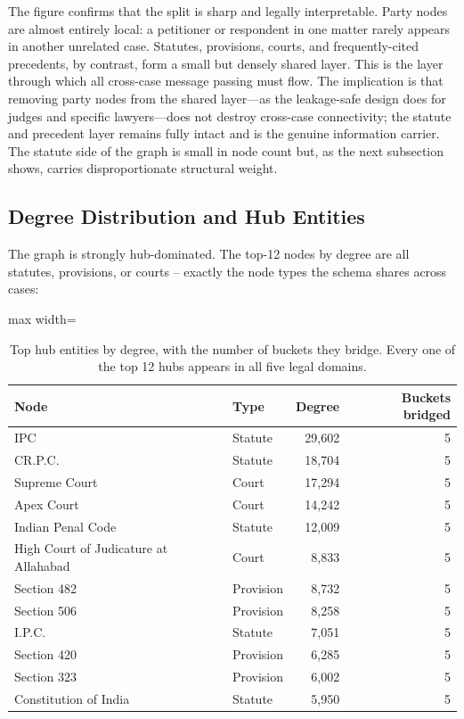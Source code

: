 The figure confirms that the split is sharp and legally interpretable. Party nodes
are almost entirely local: a petitioner or respondent in one matter rarely appears
in another unrelated case. Statutes, provisions, courts, and frequently-cited
precedents, by contrast, form a small but densely shared layer. This is the layer
through which all cross-case message passing must flow. The implication is that
removing party nodes from the shared layer---as the leakage-safe design does for
judges and specific lawyers---does not destroy cross-case connectivity; the
statute and precedent layer remains fully intact and is the genuine information
carrier. The statute side of the graph is small in node count but, as the next
subsection shows, carries disproportionate structural weight.

\subsection{Degree Distribution and Hub Entities}

The graph is strongly hub-dominated. The top-12 nodes by degree are
all statutes, provisions, or courts -- exactly the node types the
schema shares across cases:

\begin{table}[H]
  \centering
  \small
  \begin{adjustbox}{max width=\textwidth}
  \begin{tabular}{llrr}
    \toprule
    Node & Type & Degree & Buckets bridged \\
    \midrule
    IPC                                   & Statute   & 29{,}602 & 5 \\
    CR.P.C.                               & Statute   & 18{,}704 & 5 \\
    Supreme Court                         & Court     & 17{,}294 & 5 \\
    Apex Court                            & Court     & 14{,}242 & 5 \\
    Indian Penal Code                     & Statute   & 12{,}009 & 5 \\
    High Court of Judicature at Allahabad & Court     &  8{,}833 & 5 \\
    Section 482                           & Provision &  8{,}732 & 5 \\
    Section 506                           & Provision &  8{,}258 & 5 \\
    I.P.C.                                & Statute   &  7{,}051 & 5 \\
    Section 420                           & Provision &  6{,}285 & 5 \\
    Section 323                           & Provision &  6{,}002 & 5 \\
    Constitution of India                 & Statute   &  5{,}950 & 5 \\
    \bottomrule
  \end{tabular}
  \end{adjustbox}
  \caption{Top hub entities by degree, with the number of buckets they
  bridge. Every one of the top 12 hubs appears in all five legal
  domains.}
  \label{tab:top_hubs}
\end{table}

